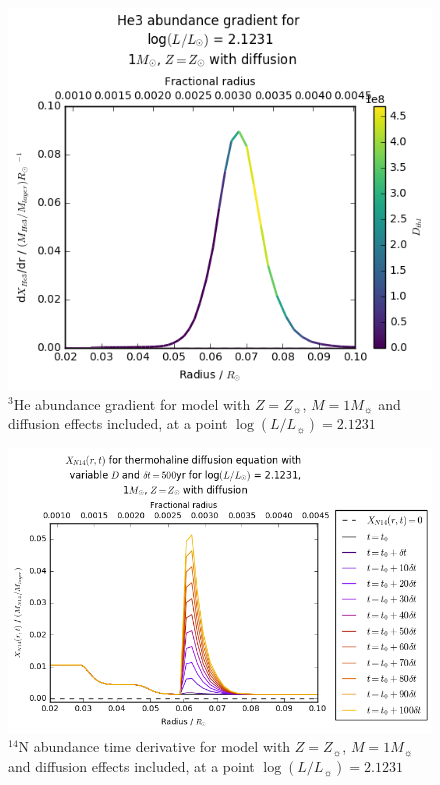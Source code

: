 \documentclass[usenatbib]{mnras}
\begin{document}
\begin{figure}
\begin{center}
\includegraphics[scale=0.6]{../mu_test_data/mu_test_graphs/eq_logL=2p1231_He3_radius_gradient_Dthl_color.png}
\caption{$^{3}$He abundance gradient for model with $Z = Z_{\sun}$, $M = 1M_{\sun}$ and diffusion effects included, at a point $\log(L/L_{\sun}) = 2.1231$}
\label{dHe3/dr_colour}
\end{center}
\end{figure}

\begin{figure}
\begin{center}
\includegraphics[scale=0.4]{../mu_test_data/mu_test_graphs/eq_logL=2p1231_time_diff_eq_Dvar_10dt_dmu_k_lim.png}
\caption{$^{14}$N abundance time derivative for model with $Z = Z_{\sun}$, $M = 1M_{\sun}$ and diffusion effects included, at a point $\log(L/L_{\sun}) = 2.1231$}
\label{dXN14/dt_colour}
\end{center}
\end{figure}
\end{document}
